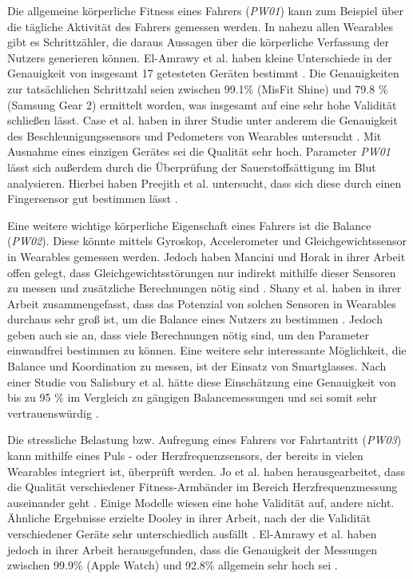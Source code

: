 Die allgemeine körperliche Fitness eines Fahrers (\textit{PW01}) kann zum Beispiel über die tägliche Aktivität des Fahrers gemessen werden. In nahezu allen Wearables gibt es Schrittzähler, die daraus Aussagen über die körperliche Verfassung der Nutzers generieren können.  El-Amrawy et al. haben kleine Unterschiede in der Genauigkeit von insgesamt 17 getesteten Geräten bestimmt \cite{wearabletracking}. Die Genauigkeiten zur tatsächlichen Schrittzahl seien zwischen 99.1\% (MisFit Shine) und 79.8 \% (Samsung Gear 2) ermittelt worden, was insgesamt auf eine sehr hohe Validität schließen lässt. Case et al. haben in ihrer Studie unter anderem die Genauigkeit des Beschleunigungssensors und Pedometers von Wearables untersucht \cite{studyaccuracysmartphoneapplications}. Mit Ausnahme eines einzigen Gerätes sei die Qualität sehr hoch. Parameter \textit{PW01} lässt sich außerdem durch die Überprüfung der Sauerstoffsättigung im Blut analysieren. Hierbei haben Preejith et al. untersucht, dass sich diese durch einen Fingersensor gut bestimmen lässt \cite{spo2oxygen}. 

Eine weitere wichtige körperliche Eigenschaft eines Fahrers ist die Balance (\textit{PW02}). Diese könnte mittels Gyroskop, Accelerometer und Gleichgewichtssensor in Wearables gemessen werden. Jedoch haben Mancini und Horak in ihrer Arbeit offen gelegt, dass Gleichgewichtsstörungen nur indirekt mithilfe dieser Sensoren zu messen und zusätzliche Berechnungen nötig sind \cite{balancewearables}. Shany et al. haben in ihrer Arbeit zusammengefasst, dass das Potenzial von solchen Sensoren in Wearables durchaus sehr groß ist, um die Balance eines Nutzers zu bestimmen \cite{sensorbasedfalls}. Jedoch geben auch sie an, dass viele Berechnungen nötig sind, um den Parameter einwandfrei bestimmen zu können. Eine weitere sehr interessante Möglichkeit, die Balance und Koordination zu messen, ist der Einsatz von Smartglasses. Nach einer Studie von Salisbury et al. hätte diese Einschätzung eine Genauigkeit von bis zu 95 \% im Vergleich zu gängigen Balancemessungen und sei somit sehr vertrauenswürdig \cite{smartglasses}.

Die stressliche Belastung bzw. Aufregung eines Fahrers vor Fahrtantritt (\textit{PW03}) kann mithilfe eines Puls - oder Herzfrequenzsensors, der bereits in vielen Wearables integriert ist, überprüft werden. Jo et al. haben herausgearbeitet, dass die Qualität verschiedener Fitness-Armbänder im Bereich Herzfrequenzmessung auseinander geht \cite{biofeedbackwearables}. Einige Modelle wiesen eine hohe Validität auf, andere nicht. Ähnliche Ergebnisse erzielte Dooley in ihrer Arbeit, nach der die Validität verschiedener Geräte sehr unterschiedlich ausfällt \cite{selfmonitoringheartrate}. El-Amrawy et al. haben jedoch in ihrer Arbeit herausgefunden, dass die Genauigkeit der Messungen zwischen 99.9\% (Apple Watch) und 92.8\% allgemein sehr hoch sei \cite{wearabletracking}. 


